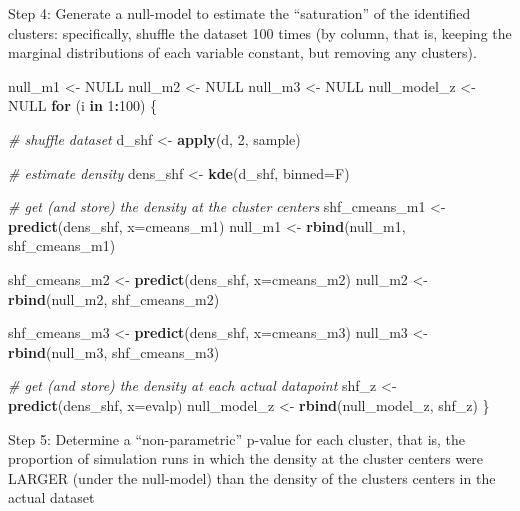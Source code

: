 \documentclass[]{article}
\newenvironment{Shaded}{\begin{snugshade}}{\end{snugshade}}
\newcommand{\CommentTok}[1]{\textcolor[rgb]{0.56,0.35,0.01}{\textit{#1}}}
\newcommand{\ControlFlowTok}[1]{\textcolor[rgb]{0.13,0.29,0.53}{\textbf{#1}}}
\newcommand{\DataTypeTok}[1]{\textcolor[rgb]{0.13,0.29,0.53}{#1}}
\newcommand{\DecValTok}[1]{\textcolor[rgb]{0.00,0.00,0.81}{#1}}
\newcommand{\KeywordTok}[1]{\textcolor[rgb]{0.13,0.29,0.53}{\textbf{#1}}}
\newcommand{\NormalTok}[1]{#1}
\newcommand{\OperatorTok}[1]{\textcolor[rgb]{0.81,0.36,0.00}{\textbf{#1}}}
\newcommand{\OtherTok}[1]{\textcolor[rgb]{0.56,0.35,0.01}{#1}}
\newcommand{\StringTok}[1]{\textcolor[rgb]{0.31,0.60,0.02}{#1}}
\begin{document}
Step 4: Generate a null-model to estimate the ``saturation'' of the
identified clusters: specifically, shuffle the dataset 100 times (by
column, that is, keeping the marginal distributions of each variable
constant, but removing any clusters).

\begin{Shaded}
\begin{Highlighting}[]
\NormalTok{null_m1 <-}\StringTok{ }\OtherTok{NULL}
\NormalTok{null_m2 <-}\StringTok{ }\OtherTok{NULL}
\NormalTok{null_m3 <-}\StringTok{ }\OtherTok{NULL}
\NormalTok{null_model_z <-}\StringTok{ }\OtherTok{NULL}
\ControlFlowTok{for}\NormalTok{ (i }\ControlFlowTok{in} \DecValTok{1}\OperatorTok{:}\DecValTok{100}\NormalTok{) \{}

  \CommentTok{# shuffle dataset}
\NormalTok{  d_shf <-}\StringTok{ }\KeywordTok{apply}\NormalTok{(d, }\DecValTok{2}\NormalTok{, sample)}
  
  \CommentTok{# estimate density}
\NormalTok{  dens_shf <-}\StringTok{ }\KeywordTok{kde}\NormalTok{(d_shf, }\DataTypeTok{binned=}\NormalTok{F)}
  
  \CommentTok{# get (and store) the density at the cluster centers}
\NormalTok{  shf_cmeans_m1 <-}\StringTok{ }\KeywordTok{predict}\NormalTok{(dens_shf, }\DataTypeTok{x=}\NormalTok{cmeans_m1)}
\NormalTok{  null_m1 <-}\StringTok{ }\KeywordTok{rbind}\NormalTok{(null_m1, shf_cmeans_m1)}
  
\NormalTok{  shf_cmeans_m2 <-}\StringTok{ }\KeywordTok{predict}\NormalTok{(dens_shf, }\DataTypeTok{x=}\NormalTok{cmeans_m2)}
\NormalTok{  null_m2 <-}\StringTok{ }\KeywordTok{rbind}\NormalTok{(null_m2, shf_cmeans_m2)}
  
\NormalTok{  shf_cmeans_m3 <-}\StringTok{ }\KeywordTok{predict}\NormalTok{(dens_shf, }\DataTypeTok{x=}\NormalTok{cmeans_m3)}
\NormalTok{  null_m3 <-}\StringTok{ }\KeywordTok{rbind}\NormalTok{(null_m3, shf_cmeans_m3)}
  
  \CommentTok{# get (and store) the density at each actual datapoint}
\NormalTok{  shf_z <-}\StringTok{ }\KeywordTok{predict}\NormalTok{(dens_shf, }\DataTypeTok{x=}\NormalTok{evalp)}
\NormalTok{  null_model_z <-}\StringTok{ }\KeywordTok{rbind}\NormalTok{(null_model_z, shf_z)}
\NormalTok{\}}
\end{Highlighting}
\end{Shaded}

Step 5: Determine a ``non-parametric'' p-value for each cluster, that
is, the proportion of simulation runs in which the density at the
cluster centers were LARGER (under the null-model) than the density of
the clusters centers in the actual dataset
\end{document}
